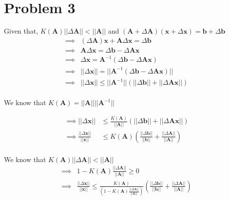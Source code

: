 \documentclass[12pt, letterpaper]{article}
\begin{document}
\pagebreak
\section*{Problem 3} Given that, $K(\mathbf{A})||\Delta \mathbf{A}|| < ||\mathbf{A}||$ and $(\mathbf{A} + \Delta \mathbf{A})(\mathbf{x} + \Delta \mathbf{x}) = \mathbf{b} + \Delta \mathbf{b}$\\

\begin{align*}
  \implies &(\Delta \mathbf{A})\mathbf{x} + \mathbf{A}\Delta \mathbf{x} = \Delta \mathbf{b}\\
  \implies &\mathbf{A}\Delta \mathbf{x} = \Delta \mathbf{b} - \Delta\mathbf{A}\mathbf{x}\\
  \implies &\Delta \mathbf{x} = \mathbf{A}^{-1}(\Delta \mathbf{b} - \Delta \mathbf{Ax})\\
  \implies &||\Delta \mathbf{x}|| = ||\mathbf{A}^{-1}(\Delta \mathbf{b} - \Delta \mathbf{Ax})||\\
  \implies &||\Delta \mathbf{x}|| \leq ||\mathbf{A}^{-1}||(||\Delta \mathbf{b}|| + ||\Delta \mathbf{Ax}||)\\
\end{align*}

We know that $K(\mathbf{A}) = ||\mathbf{A}||||\mathbf{A}^{-1}||$

\begin{align*}
  \implies ||\Delta \mathbf{x}|| &\leq \frac{K(\mathbf{A})}{||\mathbf{A}||}(||\Delta \mathbf{b}|| + ||\Delta \mathbf{Ax}||)\\
  \implies \frac{||\Delta \mathbf{x}||}{||\mathbf{x}||} &\leq
                                                          K(\mathbf{A}) \left( \frac{||\Delta \mathbf{b}||}{||\mathbf{b}||}
   + \frac{||\Delta \mathbf{A}||}{||\mathbf{A}||}\right)\\
\end{align*}

We know that $K(\mathbf{A})||\Delta \mathbf{A}|| < ||\mathbf{A}||$
\begin{align*}
  \implies &1 - K(\mathbf{A})\frac{||\Delta \mathbf{A}||}{||\mathbf{A}||} \geq 0\\
  \implies &\frac{||\Delta \mathbf{x}||}{||\mathbf{x}||} \leq
   \frac{K(\mathbf{A})}{(1 - K(\mathbf{A})\frac{||\Delta \mathbf{A}||}{||\mathbf{A}||})} \left( \frac{||\Delta \mathbf{b}||}{||\mathbf{b}||}
   + \frac{||\Delta \mathbf{A}||}{||\mathbf{A}||}\right)\\
\end{align*}
\end{document}
